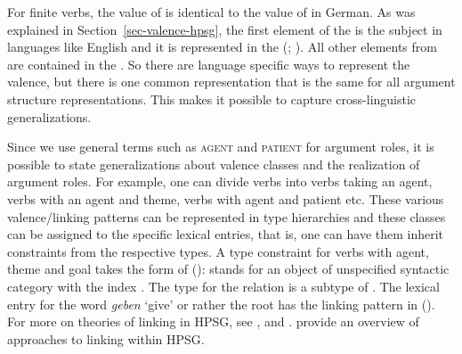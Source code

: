 For finite verbs, the value of \argst is identical to the
value of \comps in German. As was explained in Section~\ref{sec-valence-hpsg}, the first element of the \argstl is the
subject in languages like English and it is represented in the \sprl (\citealt*[Section 4.3, 7.3.1]{SWB2003a}; \citealt{MuellerGermanic}). All other elements from \argst
are contained in the \compsl. So there are language specific ways to represent the valence, but there is one
common representation that is the same for all argument structure representations. This makes it
possible to capture cross-linguistic generalizations.

Since we use general terms such as \textsc{agent} and \textsc{patient} for argument roles, it is possible to state generalizations about valence classes and
the realization of argument roles. For example, one can divide verbs into verbs taking an agent, verbs with an agent and theme, verbs with agent and patient etc.
These various valence/linking patterns can be represented in type hierarchies and
these classes can be assigned to the specific lexical entries, that is, one can have them inherit
constraints from the respective types. A type constraint for verbs with agent, theme
and goal takes the form of ():
\ea
\label{ex-agens-theme-goal-linking}
\z
[] stands for an object of unspecified syntactic category with the index
. 
The type for the relation  is a subtype of .
The lexical entry for the word \emph{geben} `give' or rather the root  has the linking pattern in ().
%
For more on theories of linking in HPSG, see ,  and
. \citet{DKW2021a} provide an overview of approaches to linking within HPSG.

